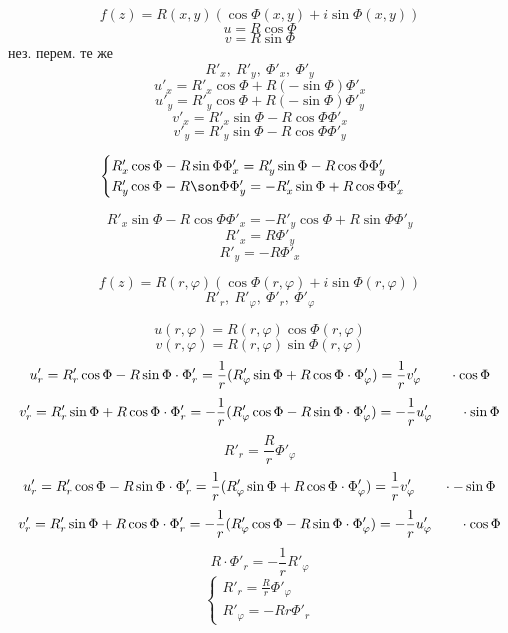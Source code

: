 \documentclass[main]{subfiles}
\begin{document}
\begin{lect}
   \begin{Task}[4]
        \[f(z) = R(x, y) (\cos \Phi(x, y) + i\sin \Phi(x, y))\]
        \[u = R \cos \Phi\]
        \[v = R \sin \Phi\]
        нез. перем. те же 
        \[R'_x, \ R'_y, \ \Phi'_x, \ \Phi'_y\]
        \[u'_x = R'_x\cos \Phi + R (-\sin \Phi) \Phi'_x\]
        \[u'_y = R'_y \cos \Phi + R(-\sin \Phi) \Phi'_y\]
        \[v'_x = R'_x \sin \Phi - R\cos \Phi \Phi'_x\]
        \[v'_y = R'_y \sin \Phi - R \cos \Phi \Phi'_y\]
      
        \[\begin{cases}
            R'_x \cos \Phi - R\sin \Phi \Phi'_x = R'_y \sin \Phi - R\cos\Phi \Phi'_y\\
            R'_y \cos \Phi - R\son \Phi \Phi'_y = -R'_x \sin \Phi + R\cos \Phi \Phi'_x     
        \end{cases}\]

        \[R'_x \sin \Phi - R\cos \Phi \Phi'_x = - R'_y \cos \Phi + R\sin \Phi \Phi'_y\]
        \[R'_x = R \Phi'_y\]
        \[R'_y = -R\Phi'_x\]
   \end{Task}

   \begin{Task}[4]
       \[f(z) = R(r, \varphi)(\cos\Phi(r, \varphi) + i\sin\Phi(r, \varphi))\]
       \[R'_r, \ R'_\varphi, \ \Phi'_r, \ \Phi'_\varphi\]

       \[u(r, \varphi) = R(r, \varphi) \cos \Phi(r, \varphi)\]
       \[v(r, \varphi) = R(r, \varphi) \sin \Phi(r, \varphi)\]
       \[u'_r = R'_r \cos \Phi - R\sin \Phi \cdot \Phi'_r = \frac{1}{r} (R'_\varphi\sin\Phi + 
       R\cos \Phi \cdot \Phi'_\varphi) = \frac{1}{r}v'_\varphi \qquad \cdot \cos \Phi\]
       \[v'_r = R'_r \sin \Phi + R\cos \Phi \cdot \Phi'_r = -\frac{1}{r}(R'_\varphi\cos\Phi - 
       R\sin \Phi \cdot \Phi'_\varphi) = -\frac{1}{r}u'_\varphi \qquad \cdot \sin \Phi\]
       \[R'_r = \frac{R}{r}\Phi'_\varphi\]
       \[u'_r = R'_r \cos \Phi - R\sin \Phi \cdot \Phi'_r = \frac{1}{r} (R'_\varphi\sin\Phi + 
       R\cos \Phi \cdot \Phi'_\varphi) = \frac{1}{r}v'_\varphi \qquad \cdot -\sin \Phi\]
       \[v'_r = R'_r \sin \Phi + R\cos \Phi \cdot \Phi'_r = -\frac{1}{r}(R'_\varphi\cos\Phi - 
       R\sin \Phi \cdot \Phi'_\varphi) = -\frac{1}{r}u'_\varphi \qquad \cdot \cos \Phi\]
       \[R \cdot \Phi'_r = - \frac{1}{r} R'_\varphi\]
       \[\begin{cases}
           R'_r = \frac{R}{r}\Phi'_\varphi\\
           R'_\varphi = - Rr \Phi'_r
       \end{cases}\]
   \end{Task}


\end{lect}
\end{document}
